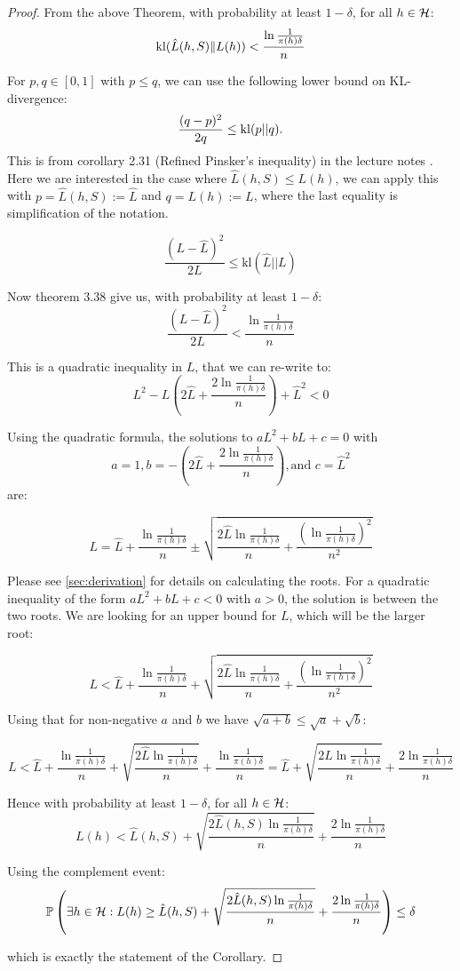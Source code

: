 \begin{proof}
From the above Theorem, with probability at least $1-\delta$, for all $h \in \mathcal H$:
$$\operatorname{kl}(\hat{L}(h,S)\|L(h)) < \frac{\ln\frac{1}{\pi(h)\delta}}{n}$$

For $p, q \in [0,1]$ with $p \leq q$, we can use the following lower bound on KL-divergence:
\begin{equation*}
\frac{(q-p)^2}{2q} \leq \operatorname{kl}(p||q).
\end{equation*}
This is from corollary 2.31 (Reﬁned Pinsker’s inequality) in the lecture notes \cite{seldinMachineLearningScience2025}. Here we are interested in the case where $\hat{L}(h,S) \leq L(h)$, we can apply this with $p = \hat{L}(h,S) := \hat{L}$ and $q = L(h) := L$, where the last equality is simplification of the notation.

$$\frac{(L-\hat{L})^2}{2L} \leq \text{kl}(\hat{L}||L)$$

Now theorem 3.38 give us, with probability at least $1-\delta$:
$$\frac{(L-\hat{L})^2}{2L} < \frac{\ln\frac{1}{\pi(h)\delta}}{n}$$

This is a quadratic inequality in $L$, that we can re-write to:
$$L^2 - L\left(2\hat{L} + \frac{2\ln\frac{1}{\pi(h)\delta}}{n}\right) + \hat{L}^2 < 0$$

Using the quadratic formula, the solutions to $aL^2 + bL + c = 0$ with $$a = 1, b = -\left(2\hat{L} + \frac{2\ln\frac{1}{\pi(h)\delta}}{n}\right), \text{and } c = \hat{L}^2$$ are:

$$L = \hat{L} + \frac{\ln\frac{1}{\pi(h)\delta}}{n} \pm \sqrt{\frac{2\hat{L}\ln\frac{1}{\pi(h)\delta}}{n} + \frac{(\ln\frac{1}{\pi(h)\delta})^2}{n^2}}$$

Please see \ref{sec:derivation} for details on calculating the roots. For a quadratic inequality of the form $aL^2 + bL + c < 0$ with $a > 0$, the solution is between the two roots. We are looking for an upper bound for $L$, which will be the larger root:

$$L < \hat{L} + \frac{\ln\frac{1}{\pi(h)\delta}}{n} + \sqrt{\frac{2\hat{L}\ln\frac{1}{\pi(h)\delta}}{n} + \frac{(\ln\frac{1}{\pi(h)\delta})^2}{n^2}}$$

Using that for non-negative $a$ and $b$ we have $\sqrt{a+b} \leq \sqrt{a} + \sqrt{b}$:

$$L < \hat{L} + \frac{\ln\frac{1}{\pi(h)\delta}}{n} + \sqrt{\frac{2\hat{L}\ln\frac{1}{\pi(h)\delta}}{n}} + \frac{\ln\frac{1}{\pi(h)\delta}}{n} = \hat{L} + \sqrt{\frac{2\hat{L}\ln\frac{1}{\pi(h)\delta}}{n}} + \frac{2\ln\frac{1}{\pi(h)\delta}}{n}$$

Hence with probability at least $1-\delta$, for all $h \in \mathcal H$:
$$L(h) < \hat{L}(h,S) + \sqrt{\frac{2\hat{L}(h,S)\ln\frac{1}{\pi(h)\delta}}{n}} + \frac{2\ln\frac{1}{\pi(h)\delta}}{n}$$

Using the complement event:
$$\P\left(\exists h \in \mathcal{H} : L(h) \geq \hat{L}(h,S) + \sqrt{\frac{2\hat{L}(h,S)\ln\frac{1}{\pi(h)\delta}}{n}} + \frac{2\ln\frac{1}{\pi(h)\delta}}{n}\right) \leq \delta$$

which is exactly the statement of the Corollary.
\end{proof}

